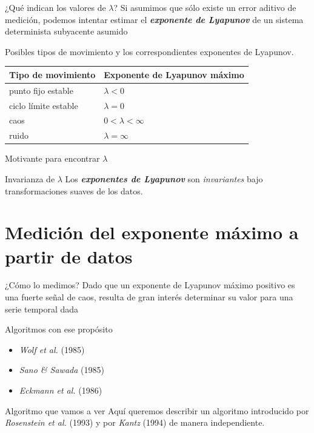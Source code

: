 \documentclass[11pt]{beamer}
\begin{document}
\begin{frame}{¿Qué indican los valores de $\lambda$?}
	Si asumimos que sólo existe un error aditivo de medición, podemos intentar estimar el \textbf{\textit{exponente de Lyapunov}} de un sistema determinista subyacente asumido
	\begin{block}{Posibles tipos de movimiento y los correspondientes exponentes de Lyapunov.}
		\begin{table}[h!]
		\centering
		\begin{tabular}{ll}
			\hline\hline
			\textbf{Tipo de movimiento} & \textbf{Exponente de Lyapunov máximo} \\
			\hline
			punto fijo estable & $\lambda < 0$ \\
			ciclo límite estable & $\lambda = 0$ \\
			caos & $0 < \lambda < \infty$ \\
			ruido & $\lambda = \infty$ \\
			\hline\hline
		\end{tabular}
		\end{table}
	\end{block}
\end{frame}

\begin{frame}{Motivante para encontrar $\lambda$}
	\begin{block}{Invarianza de $\lambda$}
		Los \textbf{\textit{exponentes de Lyapunov}} son \textit{invariantes} bajo transformaciones suaves de los datos.
	\end{block}
\end{frame}

\section{Medición del exponente máximo a partir de datos}
\begin{frame} 
\tableofcontents[currentsection] %
\end{frame}

\begin{frame}{¿Cómo lo medimos?}
	Dado que un exponente de Lyapunov máximo positivo es una fuerte señal de caos, resulta de gran interés determinar su valor para una serie temporal dada
	\begin{block}{Algoritmos con ese propósito}
		\begin{itemize}
			\item \textit{Wolf et al.} (1985)
			\item \textit{Sano \& Sawada} (1985) 
			\item \textit{Eckmann et al.} (1986)
		\end{itemize}		
	\end{block}
	\begin{block}{Algoritmo que vamos a ver}
		Aquí queremos describir un algoritmo introducido por \textit{Rosenstein et al.} (1993) y por \textit{Kantz} (1994) de manera independiente.
	\end{block}

\end{frame}
\end{document}
